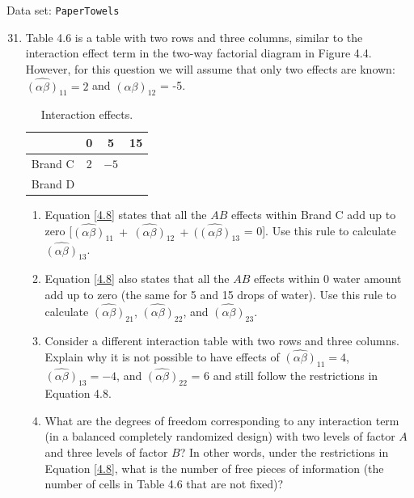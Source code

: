 \documentclass[
]{report}
\begin{document}
\vspace{-1em}

Data set: \texttt{PaperTowels}

\begin{enumerate}
  \setcounter{enumi}{30}

  \item Table 4.6 is a table with two rows and three columns, similar to the interaction effect term in the two-way factorial diagram in Figure 4.4. However, for this question we will assume that only two effects are known: $\scriptstyle \widehat{(\alpha\beta)}_{11} = 2$ and $\scriptstyle \widehat{(\alpha\beta)}_{12}$ = -5.

\begin{table}[!h]
\centering
\caption{\label{tab:tab6}Interaction effects.}
\centering
\begin{tabular}[t]{lccc}
\toprule
  & 0 & 5 & 15\\
\midrule
Brand C & 2 & $-5$ & \\
Brand D &  &  & \\
\bottomrule
\end{tabular}
\end{table}

\begin{enumerate}
   \item  Equation \ref{4.8} states that all the $\scriptstyle AB$ effects within Brand C add up to zero [$\scriptstyle \widehat{(\alpha\beta)}_{11} \ +\  \widehat{(\alpha\beta)}_{12} \ +\  (\widehat{(\alpha\beta)}_{13}$ = 0]. Use this rule to calculate $\scriptstyle \widehat{(\alpha\beta)}_{13}$.
   \item Equation \ref{4.8} also states that all the $\scriptstyle AB$ effects within 0 water amount add up to zero (the same for 5 and 15 drops of water). Use this rule to calculate $\scriptstyle \widehat{(\alpha\beta)}_{21}$, $\scriptstyle \widehat{(\alpha\beta)}_{22}$, and $\scriptstyle \widehat{(\alpha\beta)}_{23}$.
  \item Consider a different interaction table with two rows and three columns. Explain why it is not possible to have effects of $\scriptstyle \widehat{(\alpha\beta)}_{11} = 4$, $\scriptstyle \widehat{(\alpha\beta)}_{13} = -4$, and $\scriptstyle \widehat{(\alpha\beta)}_{22}$ = 6 and still follow the restrictions in Equation 4.8.
  \item What are the degrees of freedom corresponding to any interaction term (in a balanced completely randomized design) with two levels of factor $\scriptstyle A$ and three levels of factor $\scriptstyle B$? In other words, under the restrictions in Equation \ref{4.8}, what is the number of free pieces of information (the number of cells in Table 4.6 that are not fixed)?
\end{enumerate}


\end{enumerate}
\end{document}
